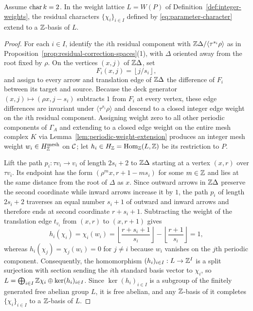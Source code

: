 \begin{proposition}
\label{prop:primitive-parameter-characters}
Assume $\operatorname{char} k=2$. In the weight lattice $L=W(P)$ of
Definition~\ref{def:integer-weights}, the residual characters
$\{\chi_i\}_{i\in I}$ defined by \eqref{eq:parameter-character} extend to a
$\mathbb Z$-basis of $L$.
\end{proposition}
\begin{proof}
For each $i\in I$, identify the $i$th residual component with
$\mathbb Z\Delta/\langle\tau^{s_i}\rho\rangle$ as in
Proposition~\ref{prop:residual-correction-spaces}(1), with $\Delta$ oriented
away from the root fixed by $\rho$. On the vertices $(x,j)$ of $\mathbb Z\Delta$,
set
\[
                   F_i(x,j)=\left\lfloor j/s_i\right\rfloor,
\]
and assign to every arrow and translation edge of $\mathbb Z\Delta$ the difference
of $F_i$ between its target and source. Because the deck generator
$(x,j)\mapsto(\rho x,j-s_i)$ subtracts $1$ from $F_i$ at every vertex, these
edge differences are invariant under $\langle\tau^{s_i}\rho\rangle$ and
descend to a closed integer edge weight on the $i$th residual component.
Assigning weight zero to all other periodic components of $\Gamma_A$ and
extending to a closed edge weight on the entire mesh complex $K$ via
Lemma~\ref{lem:periodic-weight-extension} produces an integer mesh weight
$w_i\in H^{\mathrm{mesh}}_{\mathbb Z}$ on $\mathcal C$; let $h_i\in H_{\mathbb Z}=\operatorname{Hom}_{\mathbb Z}(L,\mathbb Z)$
be its restriction to $P$.

Lift the path $p_i:\tau v_i\to v_i$ of length $2s_i+2$ to $\mathbb Z\Delta$ starting
at a vertex $(x,r)$ over $\tau v_i$. Its endpoint has the form
$(\rho^m x,r+1-ms_i)$ for some $m\in\mathbb Z$ and lies at the same distance from
the root of $\Delta$ as $x$. Since outward arrows in $\mathbb Z\Delta$ preserve the
second coordinate while inward arrows increase it by $1$, the path $p_i$ of
length $2s_i+2$ traverses an equal number $s_i+1$ of outward and inward
arrows and therefore ends at second coordinate $r+s_i+1$. Subtracting the
weight of the translation edge $t_{v_i}$ from $(x,r)$ to $(x,r+1)$ gives
\[
 h_i(\chi_i)=\chi_i(w_i)
 =\left\lfloor\frac{r+s_i+1}{s_i}\right\rfloor
       -\left\lfloor\frac{r+1}{s_i}\right\rfloor=1,
\]
whereas $h_i(\chi_j)=\chi_j(w_i)=0$ for $j\ne i$ because $w_i$ vanishes on
the $j$th periodic component. Consequently, the homomorphism
$(h_i)_{i\in I}:L\to\mathbb Z^I$ is a split surjection with section sending the
$i$th standard basis vector to $\chi_i$, so
$L=\bigoplus_{i\in I}\mathbb Z\chi_i\oplus\ker(h_i)_{i\in I}$. Since $\ker(h_i)_{i\in I}$
is a subgroup of the finitely generated free abelian group $L$, it is free
abelian, and any $\mathbb Z$-basis of it completes $\{\chi_i\}_{i\in I}$ to a
$\mathbb Z$-basis of $L$.
\end{proof}

